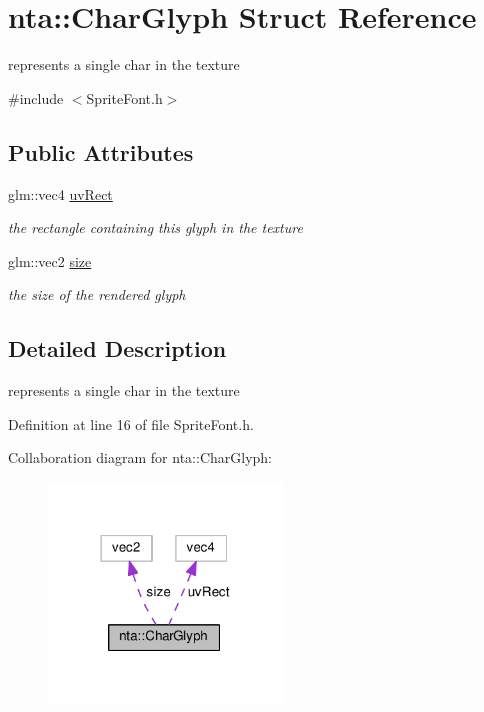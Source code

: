 \hypertarget{structnta_1_1CharGlyph}{}\section{nta\+:\+:Char\+Glyph Struct Reference}
\label{structnta_1_1CharGlyph}


represents a single char in the texture  




{\ttfamily \#include $<$Sprite\+Font.\+h$>$}

\subsection*{Public Attributes}
\begin{DoxyCompactItemize}
\item 
\mbox{\label{structnta_1_1CharGlyph_a46d9ea9c38c8bf5e1c1679e938019f53}} 
glm\+::vec4 \hyperlink{structnta_1_1CharGlyph_a46d9ea9c38c8bf5e1c1679e938019f53}{uv\+Rect}
\begin{DoxyCompactList}\small\item\em the rectangle containing this glyph in the texture \end{DoxyCompactList}\item 
\mbox{\label{structnta_1_1CharGlyph_aa2a40e6fe48ffadb4c7c95af7e82db91}} 
glm\+::vec2 \hyperlink{structnta_1_1CharGlyph_aa2a40e6fe48ffadb4c7c95af7e82db91}{size}
\begin{DoxyCompactList}\small\item\em the size of the rendered glyph \end{DoxyCompactList}\end{DoxyCompactItemize}


\subsection{Detailed Description}
represents a single char in the texture 

Definition at line 16 of file Sprite\+Font.\+h.



Collaboration diagram for nta\+:\+:Char\+Glyph\+:\nopagebreak
\begin{figure}[H]
\begin{center}
\leavevmode
\includegraphics[width=177pt]{df/ddc/structnta_1_1CharGlyph__coll__graph}
\end{center}
\end{figure}



